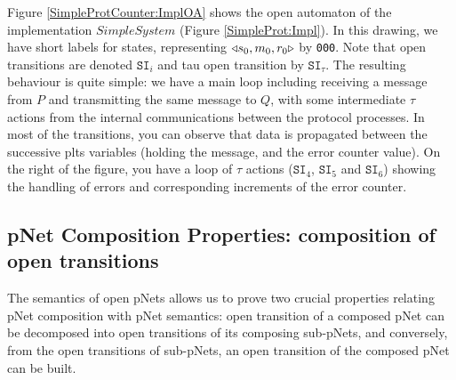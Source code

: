 \documentclass{lmcs}
\begin{document}
    Figure \ref{SimpleProtCounter:ImplOA} shows the open automaton of the implementation $SimpleSystem$ (Figure \ref{SimpleProt:Impl}). In this drawing, we have short labels for states, representing $\triangleleft{s_0,m_0,r_0}\triangleright$ by \texttt{000}. Note that open transitions are denoted $\texttt{SI}_i$ and tau open transition by  $\texttt{SI}_{\tau}$. The resulting behaviour is quite simple:  we have a main loop including receiving a message from $P$ and transmitting the same message to $Q$, with some intermediate $\tau$ actions from the internal communications between the protocol processes. In most of the transitions, you can observe that data is propagated between the successive plts variables (holding the message, and the error counter value). On the right of the figure, you have a loop of $\tau$ actions ($\texttt{SI}_4$, $\texttt{SI}_5$ and $\texttt{SI}_6$)  showing the handling of errors and corresponding increments of the error counter.
    
    
  

\subsection{pNet Composition Properties: composition of open transitions}
The semantics of open pNets allows us to prove two crucial properties relating pNet composition with pNet semantics: open transition of a composed pNet can be decomposed into open transitions of its composing sub-pNets, and conversely, from the open transitions of sub-pNets,  an open transition of the composed pNet can be built.
\end{document}
